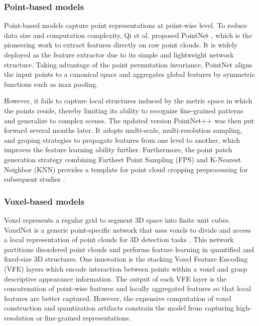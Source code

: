\documentclass[a4paper,fleqn]{cas-dc}
\begin{document}
    
\subsubsection{Point-based models}
Point-based models capture point representations at point-wise level. To reduce data size and computation complexity, Qi et al. proposed PointNet \citep{qi2017pointnet}, which is the pioneering work to extract features directly on raw point clouds. It is widely deployed as the feature extractor \citep{wang2021unsupervised,poursaeed2020self,sauder2019self} due to its simple and lightweight network structure. Taking advantage of the point permutation invariance, PointNet aligns the input points to a canonical space and aggregates global features by symmetric functions such as max pooling.

However, it fails to capture local structures induced by the metric space in which the points reside, thereby limiting its ability to recognize fine-grained patterns and generalize to complex scenes. The updated version PointNet++ \citep{qi2017pointnet++} was then put forward several months later. It adopts multi-scale, multi-resolution sampling, and groping strategies to propagate features from one level to another, which improves the feature learning ability further. Furthermore, the point patch generation strategy combining Farthest Point Sampling (FPS) and K-Nearest Neighbor (KNN) provides a template for point cloud cropping preprocessing for subsequent studies \citep{yu2021point,pang2022masked,zhang2022masked}.


\subsubsection{Voxel-based models}
Voxel represents a regular grid to segment 3D space into finite unit cubes. VoxelNet \citep{YinZhou2018VoxelNetEL} is a generic point-specific network that uses voxels to divide and access a local representation of point clouds for 3D detection tasks \citep{li2022deepfusion,min2022voxel,hess2022masked}. This network partitions disordered point clouds and performs feature learning in quantified and fixed-size 3D structures. One innovation is the stacking Voxel Feature Encoding (VFE) layers which encode interaction between points within a voxel and grasp descriptive appearance information. The output of each VFE layer is the concatenation of point-wise features and locally aggregated features so that local features are better captured. However, the expensive computation of voxel construction and quantization artifacts constrain the model from capturing high-resolution or fine-grained representations.
\end{document}
